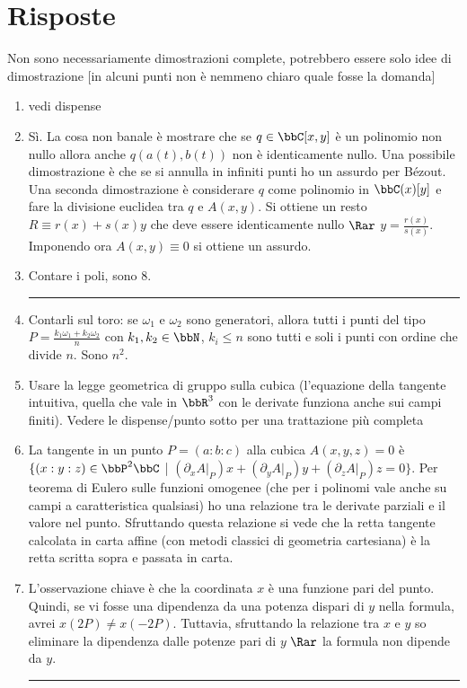 \section*{Risposte}
Non sono necessariamente dimostrazioni complete, potrebbero essere solo idee di dimostrazione [in alcuni punti non è nemmeno chiaro quale fosse la domanda]
\bigskip
\begin{enumerate}

\item vedi dispense
\item Sì. La cosa non banale è mostrare che se $q\in \bbC[x, y]$ è un polinomio non nullo allora anche $q(a(t), b(t))$ non è identicamente nullo. Una possibile dimostrazione è che se si annulla in infiniti punti ho un assurdo per Bézout. Una seconda dimostrazione è considerare $q$ come polinomio in $\bbC(x)[y]$ e fare la divisione euclidea tra $q$ e $A(x, y)$. Si ottiene un resto $R\equiv r(x)+s(x)y$  che deve essere identicamente nullo $\Rar$ $y=\frac{r(x)}{s(x)}$. Imponendo ora $A(x, y)\equiv 0$ si ottiene un assurdo.
\item Contare i poli, sono 8.
\bigskip
\hrule
\bigskip

\item Contarli sul toro: se $\omega_1$ e $\omega_2$ sono generatori, allora tutti i punti del tipo $P=\frac{k_1 \omega_1 +k_2 \omega_2}{n}$ con $k_1, k_2\in \bbN$, $k_i \leq n$ sono tutti e soli i punti con ordine che divide $n$. Sono $n^2$.
\item Usare la legge geometrica di gruppo sulla cubica (l'equazione della tangente intuitiva, quella che vale in $\bbR^3$ con le derivate funziona anche sui campi finiti). Vedere le dispense/punto sotto per una trattazione più completa
\item La tangente in un punto $P=(a:b:c)$ alla cubica $A(x, y, z)=0$ è $\{ (x:y:z)\in \bbP^2\bbC$ | $ (\partial_x A|_{P})x + (\partial_y A|_{P})y + (\partial_z A|_{P})z=0\}$. Per teorema di Eulero sulle funzioni omogenee (che per i polinomi vale anche su campi a caratteristica qualsiasi) ho una relazione tra le derivate parziali e il valore nel punto. Sfruttando questa relazione si vede che la retta tangente calcolata in carta affine (con metodi classici di geometria cartesiana) è la retta scritta sopra e passata in carta.
\item L'osservazione chiave è che la coordinata $x$ è una funzione pari del punto. Quindi, se vi fosse una dipendenza da una potenza dispari di $y$ nella formula, avrei $x(2P)\neq x(-2P)$. Tuttavia, sfruttando la relazione tra $x$ e $y$ so eliminare la dipendenza dalle potenze pari di $y$ $\Rar$ la formula non dipende da $y$. 
\bigskip
\hrule
\bigskip


\end{enumerate}
